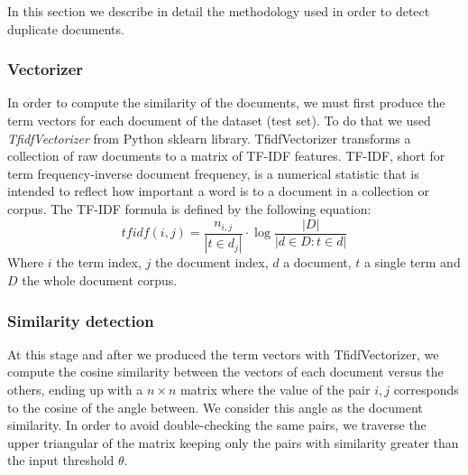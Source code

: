 In this section we describe in detail the methodology used in order to detect duplicate documents.
\subsubsection{Vectorizer}
In order to compute the similarity of the documents, we must first  produce the term vectors for each document of the dataset (test set). To do that we used \emph{TfidfVectorizer} from Python sklearn library. TfidfVectorizer transforms a collection of raw documents to a matrix of TF-IDF features. TF-IDF, short for term frequency-inverse document frequency, is a numerical statistic that is intended to reflect how important a word is to a document in a collection or corpus. \cite{rajaraman2011datamining} The TF-IDF formula is defined by the following equation\cite{victor2014csmr}\cite{evangelopoulos2016evaluating}:
\begin{equation}
	tfidf(i, j) = \frac{n_{i, j}}{|t \in d_j|} \cdot \log \frac{|D|}{|d \in D : t \in d|}
\end{equation}
Where $i$ the term index,  $j$ the document index, $d$ a document, $t$ a single term and $D$ the whole document corpus.
\subsubsection{Similarity detection}
At this stage and after we produced the term vectors with TfidfVectorizer, we compute the cosine similarity between the  vectors of each document versus the others, ending up with a $n \times n$  matrix where the value of the pair $i, j$ corresponds to the cosine of the angle between. We consider this angle as the document similarity. In order to avoid double-checking the same pairs, we traverse the upper triangular of the matrix keeping only the pairs with similarity greater than the input threshold $\theta$. 